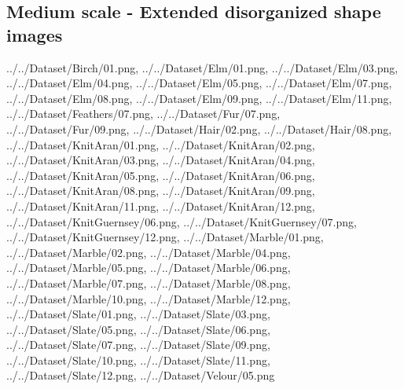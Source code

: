 \subsection{Medium scale - Extended disorganized shape images}
{../../Dataset/Birch/01.png,
../../Dataset/Elm/01.png,
../../Dataset/Elm/03.png,
../../Dataset/Elm/04.png,
../../Dataset/Elm/05.png,
../../Dataset/Elm/07.png,
../../Dataset/Elm/08.png,
../../Dataset/Elm/09.png,
../../Dataset/Elm/11.png,
../../Dataset/Feathers/07.png,
../../Dataset/Fur/07.png,
../../Dataset/Fur/09.png,
../../Dataset/Hair/02.png,
../../Dataset/Hair/08.png,
../../Dataset/KnitAran/01.png,
../../Dataset/KnitAran/02.png,
../../Dataset/KnitAran/03.png,
../../Dataset/KnitAran/04.png,
../../Dataset/KnitAran/05.png,
../../Dataset/KnitAran/06.png,
../../Dataset/KnitAran/08.png,
../../Dataset/KnitAran/09.png,
../../Dataset/KnitAran/11.png,
../../Dataset/KnitAran/12.png,
../../Dataset/KnitGuernsey/06.png,
../../Dataset/KnitGuernsey/07.png,
../../Dataset/KnitGuernsey/12.png,
../../Dataset/Marble/01.png,
../../Dataset/Marble/02.png,
../../Dataset/Marble/04.png,
../../Dataset/Marble/05.png,
../../Dataset/Marble/06.png,
../../Dataset/Marble/07.png,
../../Dataset/Marble/08.png,
../../Dataset/Marble/10.png,
../../Dataset/Marble/12.png,
../../Dataset/Slate/01.png,
../../Dataset/Slate/03.png,
../../Dataset/Slate/05.png,
../../Dataset/Slate/06.png,
../../Dataset/Slate/07.png,
../../Dataset/Slate/09.png,
../../Dataset/Slate/10.png,
../../Dataset/Slate/11.png,
../../Dataset/Slate/12.png,
../../Dataset/Velour/05.png}

\newpage
